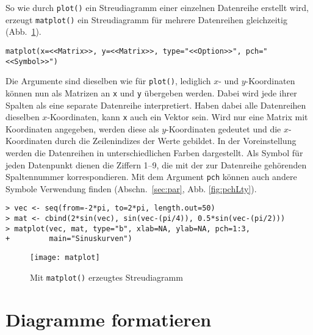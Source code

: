 So wie durch \lstinline!plot()! ein Streudiagramm einer einzelnen Datenreihe erstellt wird, erzeugt \lstinline!matplot()! ein Streudiagramm für mehrere Datenreihen gleichzeitig (Abb.\ \ref{fig:matplot}).
\begin{lstlisting}
matplot(x=<<Matrix>>, y=<<Matrix>>, type="<<Option>>", pch="<<Symbol>>")
\end{lstlisting}

Die Argumente sind dieselben wie für \lstinline!plot()!, lediglich $x$- und $y$-Koordinaten können nun als Matrizen an \lstinline!x! und \lstinline!y! übergeben werden. Dabei wird jede ihrer Spalten als eine separate Datenreihe interpretiert. Haben dabei alle Datenreihen dieselben $x$-Koordinaten, kann \lstinline!x! auch ein Vektor sein. Wird nur eine Matrix mit Koordinaten angegeben, werden diese als $y$-Koordinaten gedeutet und die $x$-Koordinaten durch die Zeilenindizes der Werte gebildet. In der Voreinstellung werden die Datenreihen in unterschiedlichen Farben dargestellt. Als Symbol für jeden Datenpunkt dienen die Ziffern 1--9, die mit der zur Datenreihe gehörenden Spaltennummer korrespondieren. Mit dem Argument \lstinline!pch! können auch andere Symbole Verwendung finden (Abschn.\ \ref{sec:par}, Abb. \ref{fig:pchLty}).
\begin{lstlisting}
> vec <- seq(from=-2*pi, to=2*pi, length.out=50)
> mat <- cbind(2*sin(vec), sin(vec-(pi/4)), 0.5*sin(vec-(pi/2)))
> matplot(vec, mat, type="b", xlab=NA, ylab=NA, pch=1:3,
+         main="Sinuskurven")
\end{lstlisting}

\begin{figure}[ht]
\centering
\texttt{[image: matplot]}
\vspace*{-1.5em}
\caption{Mit \lstinline!matplot()! erzeugtes Streudiagramm}
\label{fig:matplot}
\end{figure}

\section{Diagramme formatieren}
\label{sec:graphFormat}

